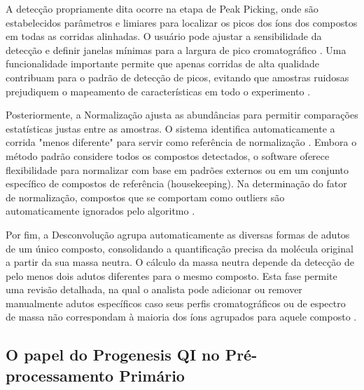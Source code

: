 A detecção propriamente dita ocorre na etapa de Peak Picking, onde são estabelecidos parâmetros e limiares para localizar os picos dos íons dos compostos em todas as corridas alinhadas\cite{watersprogenesisguide}. O usuário pode ajustar a sensibilidade da detecção e definir janelas mínimas para a largura de pico cromatográfico \cite{watersprogenesisguide}. Uma funcionalidade importante permite que apenas corridas de alta qualidade contribuam para o padrão de detecção de picos, evitando que amostras ruidosas prejudiquem o mapeamento de características em todo o experimento \cite{watersprogenesisguide}.

Posteriormente, a Normalização ajusta as abundâncias para permitir comparações estatísticas justas entre as amostras. O sistema identifica automaticamente a corrida "menos diferente" para servir como referência de normalização \cite{watersprogenesisguide}. Embora o método padrão considere todos os compostos detectados, o software oferece flexibilidade para normalizar com base em padrões externos ou em um conjunto específico de compostos de referência (housekeeping). Na determinação do fator de normalização, compostos que se comportam como outliers são automaticamente ignorados pelo algoritmo \cite{watersprogenesisguide}.

Por fim, a Desconvolução agrupa automaticamente as diversas formas de adutos de um único composto, consolidando a quantificação precisa da molécula original a partir da sua massa neutra\cite{watersprogenesisguide}. O cálculo da massa neutra depende da detecção de pelo menos dois adutos diferentes para o mesmo composto. Esta fase permite uma revisão detalhada, na qual o analista pode adicionar ou remover manualmente adutos específicos caso seus perfis cromatográficos ou de espectro de massa não correspondam à maioria dos íons agrupados para aquele composto \cite{watersprogenesisguide}.

\subsection{O papel do Progenesis QI no Pré-processamento Primário }


